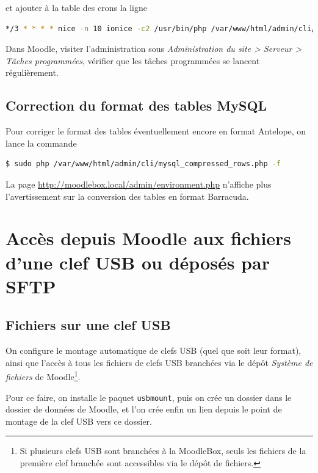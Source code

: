 \documentclass[11pt]{article}
\begin{document}
et ajouter à la table des crons la ligne
\begin{lstlisting}[language=bash]
*/3 * * * * nice -n 10 ionice -c2 /usr/bin/php /var/www/html/admin/cli/cron.php
\end{lstlisting}

\begin{verification}
Dans Moodle, visiter l'administration sous \emph{Administration du site > Serveur > Tâches programmées}, vérifier que les tâches programmées se lancent régulièrement.
\end{verification}

\subsection{Correction du format des tables MySQL}

Pour corriger le format des tables éventuellement encore en format Antelope, on lance la commande

\begin{lstlisting}[language=bash]
$ sudo php /var/www/html/admin/cli/mysql_compressed_rows.php -f
\end{lstlisting}

\begin{verification}
La page \url{http://moodlebox.local/admin/environment.php} n'affiche plus l'avertissement sur la conversion des tables en format Barracuda.
\end{verification}

\section{Accès depuis Moodle aux fichiers d'une clef USB ou déposés par SFTP}

\subsection{Fichiers sur une clef USB}

On configure le montage automatique de clefs USB (quel que soit leur format), ainsi que l'accès à tous les fichiers de clefs USB branchées via le dépôt \emph{Système de fichiers} de Moodle\footnote{Si plusieurs clefs USB sont branchées à la MoodleBox, seuls les fichiers de la première clef branchée sont accessibles via le dépôt de fichiers.}.

Pour ce faire, on installe le paquet \lstinline{usbmount}, puis on crée un dossier dans le dossier de données de Moodle, et l'on crée enfin un lien depuis le point de montage de la clef USB vers ce dossier.
\end{document}

